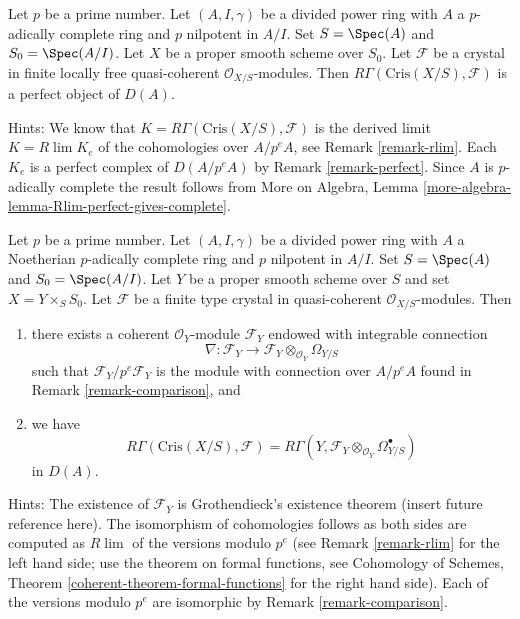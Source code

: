 \begin{remark}
\label{remark-complete-perfect}
Let $p$ be a prime number. Let $(A, I, \gamma)$ be a divided power
ring with $A$ a $p$-adically complete ring and $p$ nilpotent in $A/I$. Set
$S = \Spec(A)$ and $S_0 = \Spec(A/I)$. Let $X$ be a proper
smooth scheme over $S_0$. Let $\mathcal{F}$ be a crystal in
finite locally free quasi-coherent $\mathcal{O}_{X/S}$-modules.
Then $R\Gamma(\text{Cris}(X/S), \mathcal{F})$ is a
perfect object of $D(A)$.

\medskip\noindent
Hints: We know that $K = R\Gamma(\text{Cris}(X/S), \mathcal{F})$
is the derived limit $K = R\lim K_e$ of the cohomologies over $A/p^eA$,
see Remark \ref{remark-rlim}.
Each $K_e$ is a perfect complex of $D(A/p^eA)$ by
Remark \ref{remark-perfect}.
Since $A$ is $p$-adically complete the result
follows from
More on Algebra, Lemma \ref{more-algebra-lemma-Rlim-perfect-gives-complete}.
\end{remark}

\begin{remark}
\label{remark-complete-comparison}
Let $p$ be a prime number. Let $(A, I, \gamma)$ be a divided power
ring with $A$ a Noetherian $p$-adically complete ring and $p$ nilpotent
in $A/I$. Set $S = \Spec(A)$ and
$S_0 = \Spec(A/I)$. Let $Y$ be a proper smooth scheme over $S$ and set
$X = Y \times_S S_0$. Let $\mathcal{F}$ be a finite type crystal in
quasi-coherent $\mathcal{O}_{X/S}$-modules. Then
\begin{enumerate}
\item there exists a coherent $\mathcal{O}_Y$-module $\mathcal{F}_Y$
endowed with integrable connection
$$
\nabla :
\mathcal{F}_Y
\longrightarrow
\mathcal{F}_Y \otimes_{\mathcal{O}_Y} \Omega_{Y/S}
$$
such that $\mathcal{F}_Y/p^e\mathcal{F}_Y$ is the module with connection
over $A/p^eA$ found in Remark \ref{remark-comparison}, and
\item we have
$$
R\Gamma(\text{Cris}(X/S), \mathcal{F}) =
R\Gamma(Y, \mathcal{F}_Y \otimes_{\mathcal{O}_Y} \Omega^\bullet_{Y/S})
$$
in $D(A)$.
\end{enumerate}
Hints: The existence of $\mathcal{F}_Y$ is Grothendieck's existence theorem
(insert future reference here). The isomorphism of cohomologies follows
as both sides are computed as $R\lim$ of the versions modulo $p^e$
(see Remark \ref{remark-rlim} for the left hand side; use the theorem
on formal functions, see
Cohomology of Schemes, Theorem \ref{coherent-theorem-formal-functions}
for the right hand side).
Each of the versions modulo $p^e$ are isomorphic by
Remark \ref{remark-comparison}.
\end{remark}




